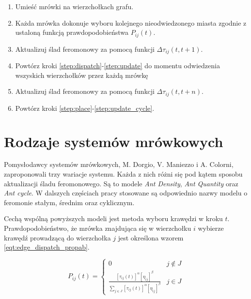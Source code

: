 {{        \begin{enumerate}
            \item \label{step:place} Umieść mrówki na wierzchołkach grafu.
            \item \label{step:dispatch} Każda mrówka dokonuje wyboru kolejnego nieodwiedzonego miasta zgodnie z ustaloną
            funkcją prawdopodobieństwa $P_{ij}(t)$.
            \item \label{step:update} Aktualizuj ślad feromonowy za pomocą funkcji $\Delta\tau_{ij}(t, t+1)$.
            \item Powtórz kroki \ref{step:dispatch}-\ref{step:update} do momentu odwiedzenia wszyskich wierzchołków
            przez każdą mrówkę
            \item \label{step:update_cycle} Aktualizuj ślad feromonowy za pomocą funkcji $\Delta\tau_{ij}(t, t+n)$.
            \item Powtórz kroki \ref{step:place}-\ref{step:update_cycle}.
        \end{enumerate}
    }

    \section{Rodzaje systemów mrówkowych}
    {
        Pomysłodawcy systemów mrówkowych, M. Dorgio, V. Maniezzo i A. Colorni, zaproponowali trzy wariacje systemu.
        Każda z nich różni się pod kątem sposobu aktualizacji śladu feromonowego. Są to modele \textit{Ant Density},
        \textit{Ant Quantity} oraz \textit{Ant cycle}. W dalszych częściach pracy stosowane są odpowiednio
        nazwy modelu o feromonie stałym, średnim oraz cyklicznym.

        Cechą wspólną powyższych modeli jest metoda wyboru krawędzi w kroku $t$. Prawdopodobieństwo, że mrówka
        znajdująca się w wierzchołku $i$ wybierze krawędź prowadzącą do wierzchołka $j$ jest określona wzorem
        \ref{eqt:edge_dispatch_propab}.

        \begin{equation}\label{eqt:edge_dispatch_propab}
            P_{ij}(t) = \left\{\begin{matrix}
                0 & j \not\in J\\
                \frac{[\tau_{ij}(t)]^\alpha [\eta_{ij}]^\beta}{\sum_{j\in J} {[\tau_{ij}(t)]^\alpha [\eta_{ij}]^\beta} } & j \in J
                \end{matrix}\right.
        \end{equation}

}}
